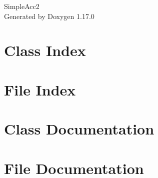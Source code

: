\documentclass[twoside]{book}
\newcommand{\+}{\discretionary{\mbox{\scriptsize$\hookleftarrow$}}{}{}}
\newcommand{\clearemptydoublepage}{%
    \newpage{\pagestyle{empty}\cleardoublepage}%
  }
\begin{document}
  \raggedbottom
    \hypersetup{pageanchor=false,
                bookmarksnumbered=true,
                pdfencoding=unicode
               }
  \begin{titlepage}
  \vspace*{7cm}
  \begin{center}%
  {\Large Simple\+Acc2}\\
  \vspace*{1cm}
  {\large Generated by Doxygen 1.17.0}\\
  \end{center}
  \end{titlepage}
  \clearemptydoublepage
  \tableofcontents
  \clearemptydoublepage
  \hypersetup{pageanchor=true}
\chapter{Class Index}

\chapter{File Index}

\chapter{Class Documentation}



\chapter{File Documentation}






  \backmatter
  \newpage
  \clearemptydoublepage
  \printindex
\end{document}
